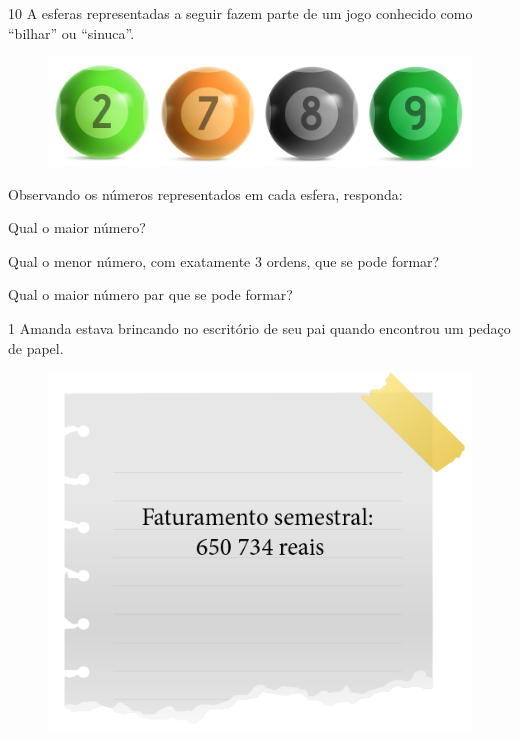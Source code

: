 
\pagebreak
\num{10} A esferas representadas a seguir fazem parte de um jogo conhecido como
“bilhar” ou “sinuca”.

\begin{figure}[htpb!]
\includegraphics[width=\textwidth]{../ilustracoes/MAT5/SAEB_5ANO_MAT_figura11.png}
\end{figure}

Observando os números representados em cada esfera, responda:

\begin{escolha}
\item  Qual o maior número?


\item  Qual o menor número, com exatamente 3 ordens, que se pode formar?


\item  Qual o maior número par que se pode formar?


\end{escolha}


\pagebreak
{}


\num{1} Amanda estava brincando no escritório de seu pai quando encontrou um pedaço de papel.

\begin{figure}[htpb!]
\centering
\includegraphics[width=.4\textwidth]{../ilustracoes/MAT5/SAEB_5ANO_MAT_figura12.png}
\end{figure}

